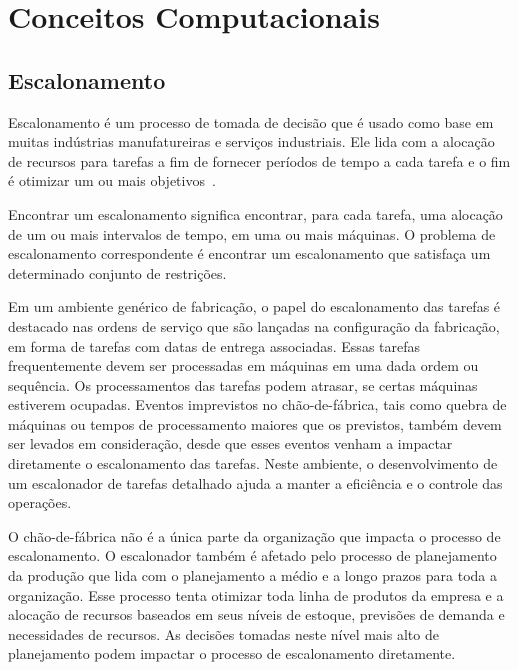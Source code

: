 \cleardoublepage
\pagestyle{fancy}


\chapter{Conceitos Computacionais}\label{cap2}

\section{Escalonamento}\label{cap2:escalonamento}

Escalonamento é um processo de tomada de decisão que é usado como base em muitas indústrias manufatureiras e serviços industriais. Ele lida com a alocação de recursos para tarefas a fim de fornecer períodos de tempo a cada tarefa  e o fim é otimizar um ou mais objetivos~\cite{pinedo2012scheduling}.

Encontrar um escalonamento significa encontrar, para cada tarefa, uma alocação de um ou mais intervalos de tempo, em uma ou mais máquinas. O problema de escalonamento correspondente é encontrar um escalonamento que satisfaça um determinado conjunto de restrições.

Em um ambiente genérico de fabricação, o papel do escalonamento das tarefas é 
destacado nas ordens de serviço que são lançadas na configuração da fabricação,
em forma de tarefas com datas de entrega associadas. Essas tarefas 
frequentemente devem ser processadas em máquinas em uma dada ordem ou 
sequência. Os processamentos das tarefas podem atrasar, se certas máquinas 
estiverem ocupadas. Eventos imprevistos no chão-de-fábrica, tais como quebra de 
máquinas ou tempos de processamento maiores que os previstos, também devem 
ser levados em consideração, desde que esses eventos venham a impactar 
diretamente o escalonamento das tarefas. Neste ambiente, o desenvolvimento de um escalonador de tarefas detalhado ajuda a manter a eficiência e o controle das 
operações. 

O chão-de-fábrica não é a única parte da organização que impacta o 
processo de escalonamento. O escalonador também é afetado pelo processo de 
planejamento da produção que lida com o planejamento a médio e a longo prazos 
para toda a organização. Esse processo tenta otimizar toda linha de produtos da 
empresa e a alocação de recursos baseados em seus níveis de estoque, previsões 
de demanda e necessidades de recursos. As decisões tomadas neste nível mais alto 
de planejamento podem impactar o processo de escalonamento diretamente. 

